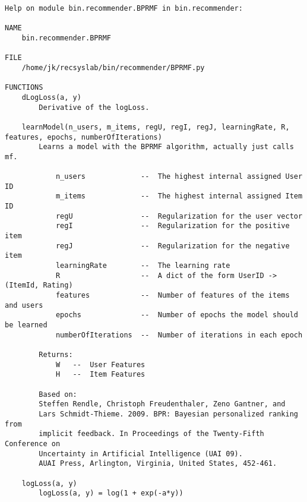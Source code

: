 \begin{lstlisting}
Help on module bin.recommender.BPRMF in bin.recommender:

NAME
    bin.recommender.BPRMF

FILE
    /home/jk/recsyslab/bin/recommender/BPRMF.py

FUNCTIONS
    dLogLoss(a, y)
        Derivative of the logLoss.
    
    learnModel(n_users, m_items, regU, regI, regJ, learningRate, R, features, epochs, numberOfIterations)
        Learns a model with the BPRMF algorithm, actually just calls mf.
        
            n_users             --  The highest internal assigned User ID
            m_items             --  The highest internal assigned Item ID
            regU                --  Regularization for the user vector
            regI                --  Regularization for the positive item
            regJ                --  Regularization for the negative item
            learningRate        --  The learning rate
            R                   --  A dict of the form UserID -> (ItemId, Rating)
            features            --  Number of features of the items and users
            epochs              --  Number of epochs the model should be learned
            numberOfIterations  --  Number of iterations in each epoch
        
        Returns:
            W   --  User Features
            H   --  Item Features
        
        Based on:
        Steffen Rendle, Christoph Freudenthaler, Zeno Gantner, and
        Lars Schmidt-Thieme. 2009. BPR: Bayesian personalized ranking from
        implicit feedback. In Proceedings of the Twenty-Fifth Conference on
        Uncertainty in Artificial Intelligence (UAI 09).
        AUAI Press, Arlington, Virginia, United States, 452-461.
    
    logLoss(a, y)
        logLoss(a, y) = log(1 + exp(-a*y))
\end{lstlisting}

